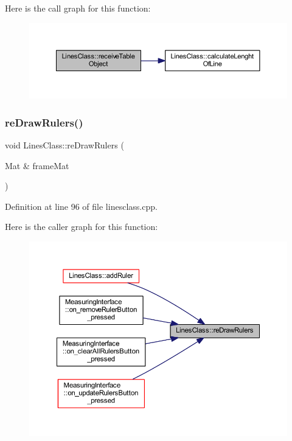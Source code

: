 Here is the call graph for this function\+:
\nopagebreak
\begin{figure}[H]
\begin{center}
\leavevmode
\includegraphics[width=350pt]{class_lines_class_a7cbdbb9847cc00cbc64141572c536866_cgraph}
\end{center}
\end{figure}
\mbox{\label{class_lines_class_a7fad9c7b48f6d55017423ffa9897b071}} 
\subsubsection{\texorpdfstring{reDrawRulers()}{reDrawRulers()}}
{\footnotesize\ttfamily void Lines\+Class\+::re\+Draw\+Rulers (\begin{DoxyParamCaption}\item[{Mat \&}]{frame\+Mat }\end{DoxyParamCaption})}



Definition at line 96 of file linesclass.\+cpp.

Here is the caller graph for this function\+:
\nopagebreak
\begin{figure}[H]
\begin{center}
\leavevmode
\includegraphics[width=350pt]{class_lines_class_a7fad9c7b48f6d55017423ffa9897b071_icgraph}
\end{center}
\end{figure}
\mbox{\label{class_lines_class_a714be78a9c85c6ba3c8456e8ee1a5290}} 
